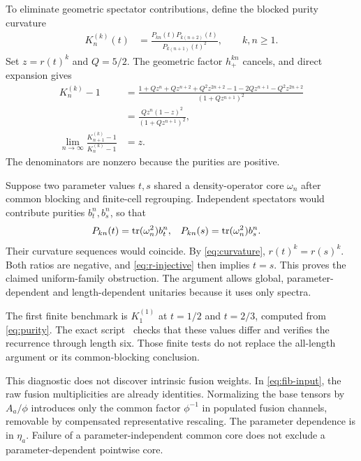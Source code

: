 \documentclass[aps,pra,reprint,nofootinbib,onecolumn]{revtex4-2}
\begin{document}
To eliminate geometric spectator contributions, define the blocked
purity curvature
\begin{align}
	K_n^{(k)}(t)
	 & =\frac{P_{kn}(t)P_{k(n+2)}(t)}{P_{k(n+1)}(t)^2},
	\qquad k,n\geq1.
\end{align}
Set $z=r(t)^k$ and $Q=5/2$. The geometric factor $h_+^{kn}$
cancels, and direct expansion gives
\begin{align}
	K_n^{(k)}-1
	                                    & =\frac{1+Qz^n+Qz^{n+2}+Q^2z^{2n+2}
		                                       -1-2Qz^{n+1}-Q^2z^{2n+2}}
	                                       {(1+Qz^{n+1})^2}
	\nonumber                                                                  \\
	                                    & =\frac{Qz^n(1-z)^2}{(1+Qz^{n+1})^2},
	\nonumber                                                                  \\
	\lim_{n\to\infty}
	\frac{K_{n+1}^{(k)}-1}{K_n^{(k)}-1} & =z.
	\label{eq:curvature}
\end{align}
The denominators are nonzero because the purities are positive.

Suppose two parameter values $t,s$ shared a density-operator core
$\omega_n$ after common blocking and finite-cell regrouping. Independent
spectators would contribute purities $b_t^n,b_s^n$, so that
\begin{align}
	P_{kn}(t) & =\operatorname{tr}(\omega_n^2)b_t^n, &
	P_{kn}(s) & =\operatorname{tr}(\omega_n^2)b_s^n.
\end{align}
Their curvature sequences would coincide. By \cref{eq:curvature},
$r(t)^k=r(s)^k$. Both ratios are negative, and \cref{eq:r-injective}
then implies $t=s$. This proves the claimed uniform-family obstruction.
The argument allows global, parameter-dependent and length-dependent
unitaries because it uses only spectra.

The first finite benchmark is $K_1^{(1)}$ at $t=1/2$ and $t=2/3$,
computed from \cref{eq:purity}. The exact script~\cite{Checks} checks
that these values differ and verifies the recurrence through length
six. Those finite tests do not replace the all-length argument or its
common-blocking conclusion.

This diagnostic does not discover intrinsic fusion weights.
In \cref{eq:fib-input}, the raw fusion multiplicities are already
identities. Normalizing the base tensors by $A_a/\phi$ introduces
only the common factor $\phi^{-1}$ in populated fusion channels,
removable by compensated representative rescaling. The parameter
dependence is in $\eta_a$. Failure of a parameter-independent common
core does not exclude a parameter-dependent pointwise core.
\end{document}
